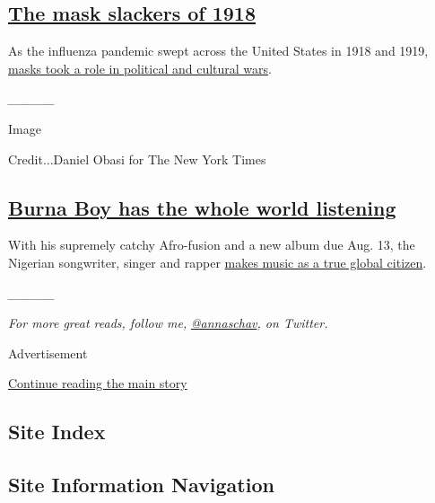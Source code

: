 \hypertarget{the-mask-slackers-of-1918}{%
\subsection{\texorpdfstring{\href{https://www.nytimes.com/2020/08/03/us/mask-protests-1918.html}{The
mask slackers of
1918}}{The mask slackers of 1918}}\label{the-mask-slackers-of-1918}}

As the influenza pandemic swept across the United States in 1918 and
1919,
\href{https://www.nytimes.com/2020/08/03/us/mask-protests-1918.html}{masks
took a role in political and cultural wars}.

\emph{\_\_\_\_\_}

Image

Credit...Daniel Obasi for The New York Times

\hypertarget{burna-boy-has-the-whole-world-listening}{%
\subsection{\texorpdfstring{\href{https://www.nytimes.com/2020/08/05/arts/music/burna-boy-twice-as-tall.html}{Burna
Boy has the whole world
listening}}{Burna Boy has the whole world listening}}\label{burna-boy-has-the-whole-world-listening}}

With his supremely catchy Afro-fusion and a new album due Aug. 13, the
Nigerian songwriter, singer and rapper
\href{https://www.nytimes.com/2020/08/05/arts/music/burna-boy-twice-as-tall.html}{makes
music as a true global citizen}.

\emph{\_\_\_\_\_}

\emph{For more great reads, follow me,}
\href{https://twitter.com/annaschav}{\emph{@annaschav}}\emph{, on
Twitter.}

Advertisement

\protect\hyperlink{after-bottom}{Continue reading the main story}

\hypertarget{site-index}{%
\subsection{Site Index}\label{site-index}}

\hypertarget{site-information-navigation}{%
\subsection{Site Information
Navigation}\label{site-information-navigation}}

